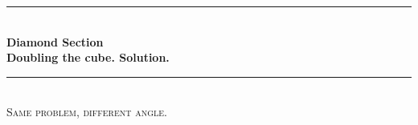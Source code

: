 \documentclass[12pt, letterpaper, oneside]{report}
\begin{document}
\begin{titlepage}

\newcommand{\HRule}{\rule{\linewidth}{0.5mm}} %

\center %
 




\HRule \\[0.8cm]
{ \huge \bfseries Diamond Section}\\[0.4cm] %
{ \large \bfseries Doubling the cube. Solution.}\\[0.2cm]
\HRule \\[1.5cm]
\textsc{\large Same problem, different angle.}\\[0.5cm] 

\begin{minipage}{0.8\textwidth}
\begin{center} \large


\end{center}

\begin{center}

\end{center}

\end{minipage}



\end{titlepage}
\end{document}
